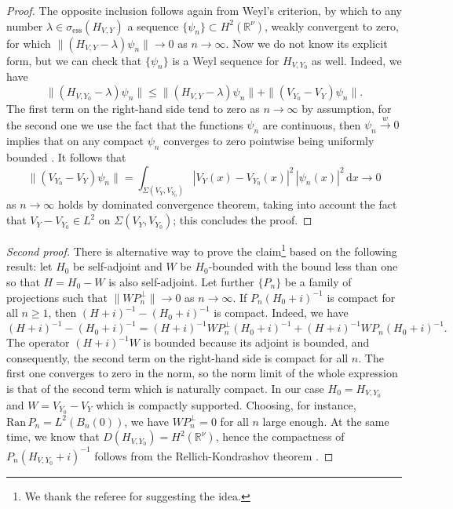\documentclass{article}
\numberwithin{equation}{section}
\theoremstyle{definition}
\newcommand{\D}{\mathrm{d}}
\newcommand{\R}{\mathbb{R}}
\begin{document}
\begin{proof}
The opposite inclusion follows again from Weyl's criterion, by which to any number $\lambda\in\sigma_\mathrm{ess}(H_{V,Y})$ a sequence $\{\psi_n\}\subset H^2(\R^\nu)$, weakly convergent to zero, for which $\|(H_{V,Y}-\lambda)\psi_n\|\to 0$ as $n\to\infty$. Now we do not know its explicit form, but we can check that $\{\psi_n\}$ is a Weyl sequence for $H_{V,Y_0}$ as well. Indeed, we have
\begin{equation*}
\|(H_{V,Y_0}-\lambda)\psi_n\| \le \|(H_{V,Y}-\lambda)\psi_n\| + \|(V_{Y_0}-V_Y)\psi_n\|.
\end{equation*}
The first term on the right-hand side tend to zero as $n\to\infty$ by assumption, for the second one we use the fact that the functions $\psi_n$ are continuous, then $\psi_n \overset{w}\longrightarrow 0$ implies that on any compact $\psi_n$ converges to zero pointwise being uniformly bounded \cite[Prop.~19.3.1]{Se71}. It follows that
\begin{equation*}
\|(V_{Y_0}-V_Y)\psi_n\| = \int_{\Sigma(V_Y,V_{Y_0})} |V_Y(x)-V_{Y_0}(x)|^2\, |\psi_n(x)|^2\, \D x \to 0
\end{equation*}
as $n\to\infty$ holds by dominated convergence theorem, taking into account the fact that $V_Y-V_{Y_0} \in L^2$ on $\Sigma(V_Y,V_{Y_0})$; this concludes the proof.
\end{proof}
\begin{proof} [Second proof]
There is alternative way to prove the claim\footnote{We thank the referee for suggesting the idea.} based on the following result: let $H_0$ be self-adjoint and $W$ be $H_0$-bounded with the bound less than one so that $H=H_0-W$ is also self-adjoint. Let further $\{P_n\}$ be a family of projections such that $\|WP_n^\perp\|\to 0$ as $n\to\infty$. If $P_n(H_0+i)^{-1}$ is compact for all $n\ge 1$, then $(H+i)^{-1}-(H_0+i)^{-1}$ is compact. Indeed, we have
 $$
(H+i)^{-1}-(H_0+i)^{-1} = (H+i)^{-1}WP_n^\perp(H_0+i)^{-1} + (H+i)^{-1}WP_n(H_0+i)^{-1}.
 $$
The operator $(H+i)^{-1}W$ is bounded because its adjoint is bounded, and consequently, the second term on the right-hand side is compact for all $n$. The first one converges to zero in the norm, so the norm limit of the whole expression is that of the second term which is naturally compact. In our case $H_0=H_{V,Y_0}$ and $W=V_{Y_0} - V_{Y}$ which is compactly supported. Choosing, for instance, $\mathrm{Ran}\,P_n = L^2(B_n(0))$, we have $WP_n^\perp=0$ for all $n$ large enough. At the same time, we know that $D(H_{V,Y_0})=H^2(\R^\nu)$, hence the compactness of $P_n(H_{V,Y_0}+i)^{-1}$ follows from the Rellich-Kondrashov theorem \cite[Theorem~{6.3}]{AF03}.
\end{proof}
\end{document}
